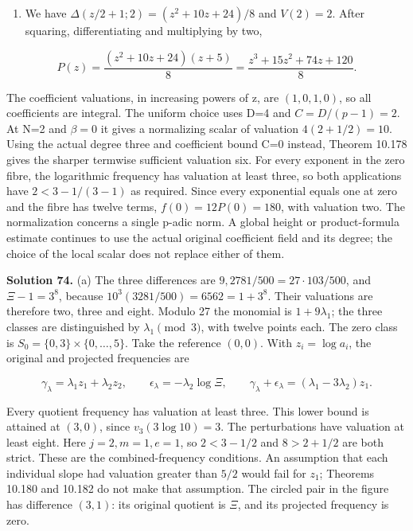 \documentclass[
  11pt,
  a4paper,
]{article}
\providecommand{\tightlist}{%
  \setlength{\itemsep}{0pt}\setlength{\parskip}{0pt}}
\begin{document}
\begin{enumerate}
\def\labelenumi{(\alph{enumi})}
\setcounter{enumi}{2}
\tightlist
\item
  We have \(\Delta(z/2+1;2)=(z^2+10z+24)/8\) and \(V(2)=2\). After
  squaring, differentiating and multiplying by two,
\end{enumerate}

\[
P(z)=\frac{(z^2+10z+24)(z+5)}8
=\frac{z^3+15z^2+74z+120}{8}.
\tag{10.680}
\]

The coefficient valuations, in increasing powers of z, are
\((1,0,1,0)\), so all coefficients are integral. The uniform choice uses
D=4 and \(C=D/(p-1)=2\). At N=2 and \(\beta=0\) it gives a normalizing
scalar of valuation \(4(2+1/2)=10\). Using the actual degree three and
coefficient bound C=0 instead, Theorem 10.178 gives the sharper termwise
sufficient valuation six. For every exponent in the zero fibre, the
logarithmic frequency has valuation at least three, so both applications
have \(2<3-1/(3-1)\) as required. Since every exponential equals one at
zero and the fibre has twelve terms, \(f(0)=12P(0)=180\), with valuation
two. The normalization concerns a single p-adic norm. A global height or
product-formula estimate continues to use the actual original
coefficient field and its degree; the choice of the local scalar does
not replace either of them.

\textbf{Solution 74.} (a) The three differences are
\(9,2781/500=27\cdot103/500\), and \(\Xi-1=3^8\), because
\(10^3(3281/500)=6562=1+3^8\). Their valuations are therefore two, three
and eight. Modulo 27 the monomial is \(1+9\lambda_1\); the three classes
are distinguished by \(\lambda_1\pmod3\), with twelve points each. The
zero class is \(S_0=\{0,3\}\times\{0,\ldots,5\}\). Take the reference
\((0,0)\). With \(z_i=\log a_i\), the original and projected frequencies
are

\[
\gamma_\lambda=\lambda_1z_1+\lambda_2z_2,\qquad
\epsilon_\lambda=-\lambda_2\log\Xi,\qquad
\gamma_\lambda+\epsilon_\lambda
 =(\lambda_1-3\lambda_2)z_1.
\tag{10.697}
\]

Every quotient frequency has valuation at least three. This lower bound
is attained at \((3,0)\), since \(v_3(3\log10)=3\). The perturbations
have valuation at least eight. Here \(j=2,m=1,e=1\), so \(2<3-1/2\) and
\(8>2+1/2\) are both strict. These are the combined-frequency
conditions. An assumption that each individual slope had valuation
greater than \(5/2\) would fail for \(z_1\); Theorems 10.180 and 10.182
do not make that assumption. The circled pair in the figure has
difference \((3,1)\): its original quotient is \(\Xi\), and its
projected frequency is zero.
\end{document}
